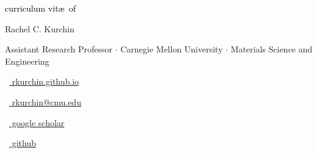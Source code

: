 \begin{scriptsize}
	 \textcolor{black}{curriculum vit\ae~of}
\end{scriptsize}

\vspace*{-0.10em}
\begin{Large} 
	Rachel C. Kurchin
\end{Large}

\vspace*{0.25em}
\begin{scshape}
	\begin{footnotesize}
		  \textcolor{highlight2}{Assistant Research Professor $\cdot$ Carnegie Mellon University $\cdot$ Materials Science and Engineering}
		  
	\end{footnotesize}
\end{scshape}
\vspace*{0.1cm}

\begin{footnotesize}
	\begin{tiny}\faHome\end{tiny}~\href{https://rkurchin.github.io}{
		rkurchin.github.io
	}
	\quad \begin{tiny}\faEnvelope[regular]\end{tiny}~\href{mailto:rkurchin@cmu.edu}{%
		rkurchin@cmu.edu
	} 	
	\quad \begin{tiny}\faGraduationCap\end{tiny}~\href{https://scholar.google.com/citations?user=rkurchin&hl=en}{
		 google scholar
		}
	\quad \begin{tiny}\faGithub[regular]\end{tiny}~\href{https://github.com/rkurchin}{%
		github
	} 

\end{footnotesize}
